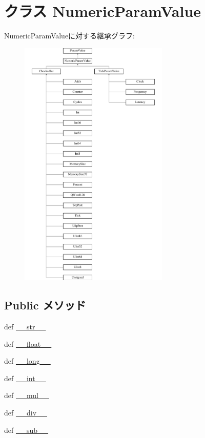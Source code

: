 \hypertarget{classm5_1_1params_1_1NumericParamValue}{
\section{クラス NumericParamValue}
\label{classm5_1_1params_1_1NumericParamValue}
}
NumericParamValueに対する継承グラフ:\begin{figure}[H]
\begin{center}
\leavevmode
\includegraphics[height=12cm]{classm5_1_1params_1_1NumericParamValue}
\end{center}
\end{figure}
\subsection*{Public メソッド}
\begin{DoxyCompactItemize}
\item 
def \hyperlink{classm5_1_1params_1_1NumericParamValue_aa7a4b9bc0941308e362738503137460e}{\_\-\_\-str\_\-\_\-}
\item 
def \hyperlink{classm5_1_1params_1_1NumericParamValue_aa9419090a59d0dc1a40065e76ab0baf9}{\_\-\_\-float\_\-\_\-}
\item 
def \hyperlink{classm5_1_1params_1_1NumericParamValue_a44b0d01b7aeedc4b3c9052a2c6ba1645}{\_\-\_\-long\_\-\_\-}
\item 
def \hyperlink{classm5_1_1params_1_1NumericParamValue_a28a958e3c802a3137bcf4b44d5cef95c}{\_\-\_\-int\_\-\_\-}
\item 
def \hyperlink{classm5_1_1params_1_1NumericParamValue_a48a7267a9f9d29d1514e713744202146}{\_\-\_\-mul\_\-\_\-}
\item 
def \hyperlink{classm5_1_1params_1_1NumericParamValue_ac3c5c39796d9cc1889749840f456b3e5}{\_\-\_\-div\_\-\_\-}
\item 
def \hyperlink{classm5_1_1params_1_1NumericParamValue_a92f51217c100657d0bf6f97b150c0a7c}{\_\-\_\-sub\_\-\_\-}
\end{DoxyCompactItemize}
